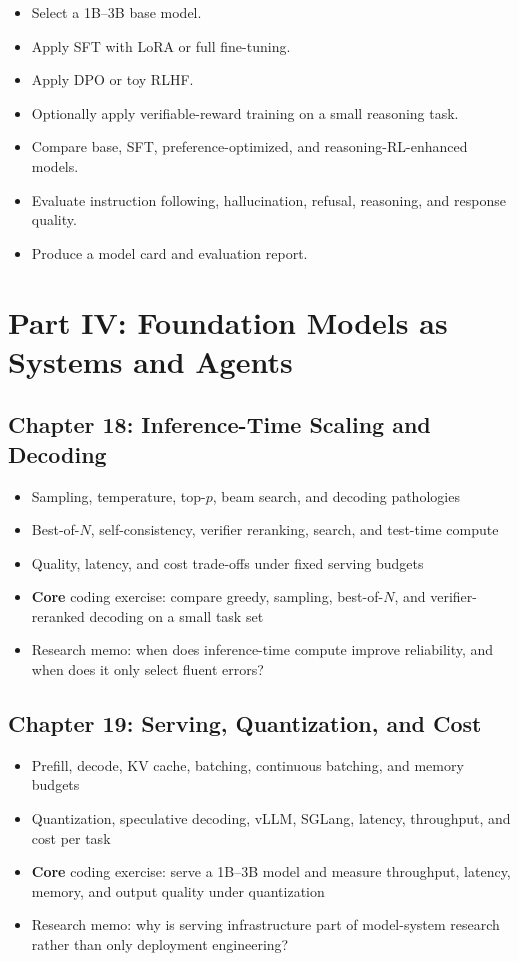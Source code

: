 \documentclass[11pt]{article}
\begin{document}
\begin{itemize}
    \item Select a 1B--3B base model.
    \item Apply SFT with LoRA or full fine-tuning.
    \item Apply DPO or toy RLHF.
    \item Optionally apply verifiable-reward training on a small reasoning task.
    \item Compare base, SFT, preference-optimized, and reasoning-RL-enhanced models.
    \item Evaluate instruction following, hallucination, refusal, reasoning, and response quality.
    \item Produce a model card and evaluation report.
\end{itemize}

\section{Part IV: Foundation Models as Systems and Agents}

\subsection{Chapter 18: Inference-Time Scaling and Decoding}

\begin{itemize}
    \item Sampling, temperature, top-$p$, beam search, and decoding pathologies
    \item Best-of-$N$, self-consistency, verifier reranking, search, and test-time compute
    \item Quality, latency, and cost trade-offs under fixed serving budgets
    \item \textbf{Core} coding exercise: compare greedy, sampling, best-of-$N$, and verifier-reranked decoding on a small task set
    \item Research memo: when does inference-time compute improve reliability, and when does it only select fluent errors?
\end{itemize}

\subsection{Chapter 19: Serving, Quantization, and Cost}

\begin{itemize}
    \item Prefill, decode, KV cache, batching, continuous batching, and memory budgets
    \item Quantization, speculative decoding, vLLM, SGLang, latency, throughput, and cost per task
    \item \textbf{Core} coding exercise: serve a 1B--3B model and measure throughput, latency, memory, and output quality under quantization
    \item Research memo: why is serving infrastructure part of model-system research rather than only deployment engineering?
\end{itemize}
\end{document}
